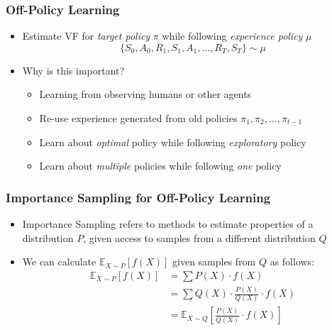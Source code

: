 \documentclass[handout]{beamer}
\begin{document}
\begin{frame}
\frametitle{Off-Policy Learning}
\pause
\begin{itemize}[<+->]
\item Estimate VF for {\em target policy} $\pi$  while following {\em experience policy} $\mu$
$$\{S_0, A_0, R_1, S_1, A_1, \ldots, R_T, S_T\} \sim \mu$$
\item Why is this important?
\begin{itemize}[<+->]
\item Learning from observing  humans or other agents
\item Re-use experience generated from  old policies  $\pi_1, \pi_2, \ldots, \pi_{t-1}$
\item Learn about {\em optimal} policy while following {\em exploratory} policy
\item Learn about {\em multiple} policies while following {\em one} policy
\end{itemize}
\end{itemize}
\end{frame}

\begin{frame}
\frametitle{Importance Sampling for Off-Policy Learning}
\pause
\begin{itemize}[<+->]
\item Importance Sampling refers to methods to estimate properties of a distribution $P$, given access to samples from a different distribution $Q$
\item We can calculate $\mathbb{E}_{X\sim P}[f(X)]$ given samples from $Q$ as follows:
\begin{align*}
\mathbb{E}_{X\sim P}[f(X)] & = \sum P(X) \cdot f(X) \\
& = \sum Q(X) \cdot \frac {P(X)} {Q(X)} \cdot f(X) \\
& = \mathbb{E}_{X \sim Q}[\frac {P(X)} {Q(X)} \cdot f(X)]
\end{align*}
\end{itemize}
\end{frame}
\end{document}
